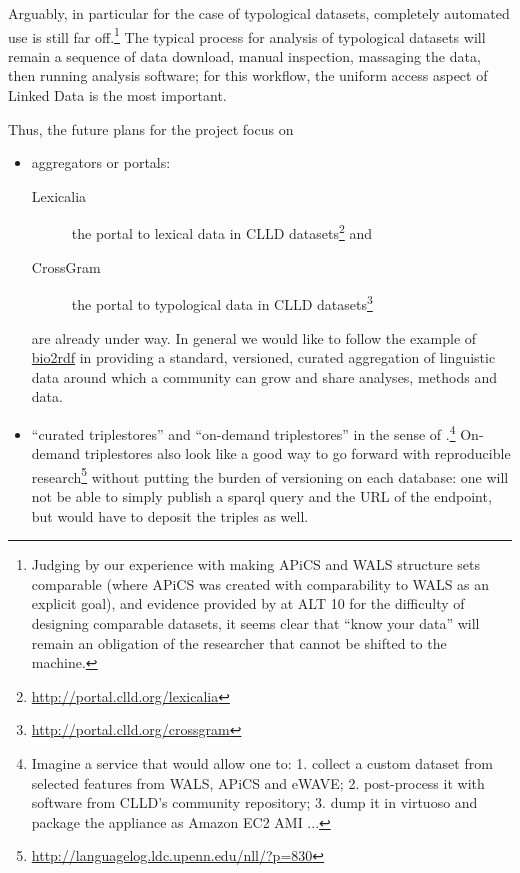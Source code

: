 \documentclass[a4paper,10pt]{article}
\begin{document}
Arguably, in particular for the case of typological datasets, completely automated use is
still far off.\footnote{Judging by our experience with making
APiCS and WALS structure sets comparable (where APiCS was created with comparability to WALS as an explicit goal),
and evidence provided by  at ALT 10 for the difficulty of designing comparable datasets,
it seems clear that ``know your data'' will remain an obligation of the researcher that cannot be shifted to the machine.}
The typical process for analysis of typological datasets will remain a sequence of 
data download, manual inspection, massaging the data, then running analysis software; for this
workflow, the uniform access aspect of Linked Data is the most important.

Thus, the future plans for the project focus on
\begin{itemize}
\item aggregators or portals:
  \begin{description}
  \item[Lexicalia] the portal to lexical data in CLLD datasets\footnote{\url{http://portal.clld.org/lexicalia}} and
  \item[CrossGram] the portal to typological data in CLLD datasets\footnote{\url{http://portal.clld.org/crossgram}}
  \end{description}
  are already under way. In general we would like to follow the example of \href{http://bio2rdf.org}{bio2rdf}
  in providing a standard, versioned, curated aggregation of linguistic data around which a
  community can grow and share analyses, methods and data.
\item ``curated triplestores'' and ``on-demand triplestores'' in the sense of .\footnote{Imagine a service that would allow one to:
1. collect a custom dataset from selected features from WALS, APiCS and eWAVE;
2. post-process it with software from CLLD's community repository;
3. dump it in virtuoso and package the appliance as Amazon EC2 AMI ...
}
  On-demand triplestores also look like a good way to go forward with reproducible research\footnote{\url{http://languagelog.ldc.upenn.edu/nll/?p=830}}
  without putting the burden of versioning on each database:
  one will not be able to simply publish a sparql query and the URL of the endpoint, but would have to deposit the triples as well.
\end{itemize}
\end{document}
